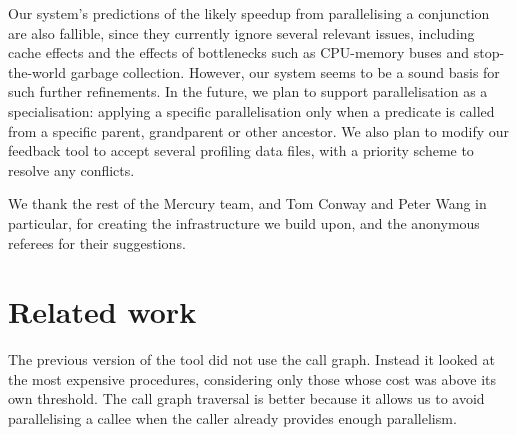 Our system's predictions of the likely speedup from parallelising a conjunction
are also fallible, since they currently ignore several relevant issues,
including cache effects
and the effects of bottlenecks
such as CPU-memory buses and stop-the-world garbage collection.
However, our system seems to be a sound basis for such further refinements.
In the future, we plan to support parallelisation as a specialisation:
applying a specific parallelisation only when a predicate is called
from a specific parent, grandparent or other ancestor.
We also plan to modify our feedback tool
to accept several profiling data files,
with a priority scheme to resolve any conflicts.

We thank the rest of the Mercury team,
and Tom Conway and Peter Wang in particular,
for creating the infrastructure we build upon,
and the anonymous referees for their suggestions.

\section{Related work}


The previous version of the tool did not use the call graph.
Instead it looked at the most expensive procedures,
considering only those whose cost was above its own threshold.
The call graph traversal is better because it allows us to avoid parallelising
a callee when the caller already provides enough parallelism.

